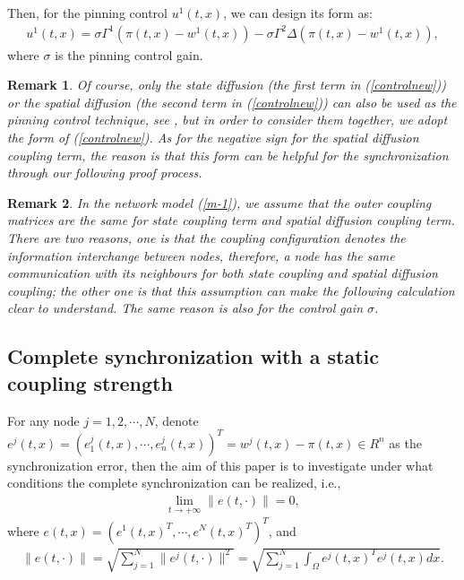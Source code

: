 \documentclass[review]{elsarticle}
\newtheorem{rem}{Remark}
\begin{document}
Then, for the pinning control $u^1(t,x)$, we can design its form as:
\begin{align}\label{controlnew}
u^1(t,x)=\sigma\Gamma^1 (\pi(t,x)-w^1(t,x))-\sigma\Gamma^2 \Delta(\pi(t,x)-w^1(t,x)),
\end{align}
where $\sigma$ is the pinning control gain.

\begin{rem}
Of course, only the state diffusion (the first term in (\ref{controlnew})) or the spatial diffusion (the second term in (\ref{controlnew})) can also be used as the pinning control technique, see \cite{WWHR2016}, but in order to consider them together, we adopt the form of (\ref{controlnew}). As for the negative sign for the spatial diffusion coupling term, the reason is that this form can be helpful for the synchronization through our following proof process.
\end{rem}

\begin{rem}
In the network model (\ref{m-1}), we assume that the outer coupling matrices are the same for state coupling term and spatial diffusion coupling term. There are two reasons, one is that the coupling configuration denotes the information interchange between nodes, therefore, a node has the same communication with its neighbours for both state coupling and spatial diffusion coupling; the other one is that this assumption can make the following calculation clear to understand. The same reason is also for the control gain $\sigma$.
\end{rem}

\subsection{Complete synchronization with a static coupling strength}\label{static}
For any node $j=1,2,\cdots,N$, denote $e^j(t,x)=(e^j_1(t,x),\cdots,e^j_n(t,x))^T=w^{j}(t,x)-\pi(t,x)\in R^n$ as the synchronization error, then the aim of this paper is to investigate under what conditions the complete synchronization can be realized, i.e.,
\begin{align}
\lim_{t\rightarrow +\infty}\|e(t,\cdot)\|=0,
\end{align}
where
$e(t,x)=(e^1(t,x)^T,\cdots,e^N(t,x)^T)^T$, and
\begin{align}\label{norm}
\|e(t,\cdot)\|=\sqrt{\sum_{j=1}^N\|e^j(t,\cdot)\|^2}=\sqrt{\sum_{j=1}^N\int_{\Omega}e^j(t,x)^Te^j(t,x)dx}.
\end{align}
\end{document}
